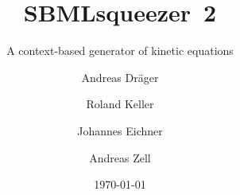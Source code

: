 \documentclass[
  BCOR12mm,
  letterpaper,
  11pt,
  headsepline,
  pointlessnumbers,
  tablecaptionabove,
  onelinecaption,
  headinclude,
  appendixprefix,
  idxtotoc,
  bibtotoc,
  twoside,
  titlepage
]{scrreprt}
\title{SBMLsqueezer~2}
\subtitle{A context-based generator of kinetic equations}
\author{Andreas Dr\"ager%
\and
Roland Keller\and
Johannes Eichner\and
Andreas Zell}
\date{\today}
\begin{document}
% 
% 
%
\maketitle
\begin{abstract}

\end{abstract}
%
\setcounter{tocdepth}{1}
\tableofcontents		%

\cleardoublepage		%


% 
% 
% 
% 
% 


% 
\appendix



\printindex
\end{document}
